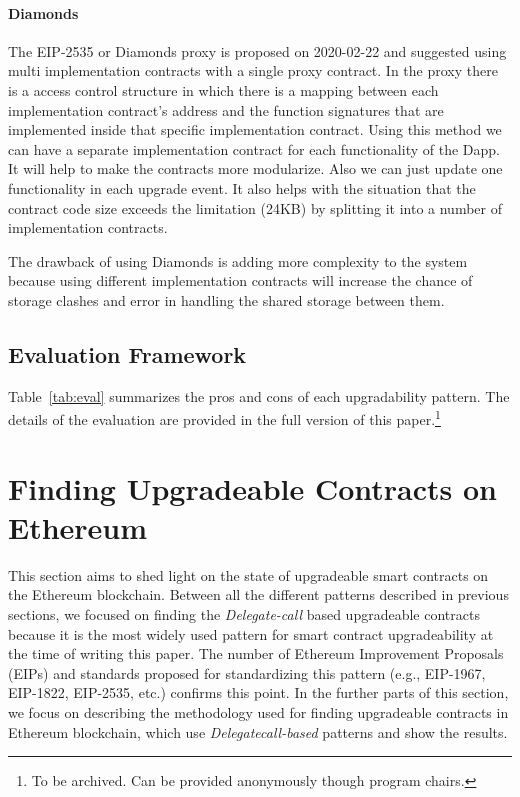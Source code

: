 \paragraph{Diamonds}
The EIP-2535 or Diamonds proxy is proposed on 2020-02-22 and suggested using multi implementation contracts with a single proxy contract. In the proxy there is a access control structure in which there is a mapping between each implementation contract's address and the function signatures that are implemented inside that specific implementation contract. Using this method we can have a separate implementation contract for each functionality of the Dapp. It will help to make the contracts more modularize. Also we can just update one functionality in each upgrade event. It also helps with the situation that the contract code size exceeds the limitation (24KB) by splitting it into a number of implementation contracts.

The drawback of using Diamonds is adding more complexity to the system because using different implementation contracts will increase the chance of storage clashes and error in handling the shared storage between them.




\subsection{Evaluation Framework}


Table~\ref{tab:eval} summarizes the pros and cons of each upgradability pattern. The details of the evaluation are provided in the full version of this paper.\footnote{To be archived. Can be provided anonymously though program chairs.}






 \section{Finding Upgradeable Contracts on Ethereum} \label{sec:proxyFinding}

 This section aims to shed light on the state of upgradeable smart contracts on the Ethereum blockchain. Between all the different patterns described in previous sections, we focused on finding the \textit{Delegate-call} based upgradeable contracts because it is the most widely used pattern for smart contract upgradeability at the time of writing this paper. The number of Ethereum Improvement Proposals (EIPs) and standards proposed for standardizing this pattern (e.g., EIP-1967, EIP-1822, EIP-2535, etc.) confirms this point. In the further parts of this section, we focus on describing the methodology used for finding upgradeable contracts in Ethereum blockchain, which use \textit{Delegatecall-based} patterns and show the results. 

